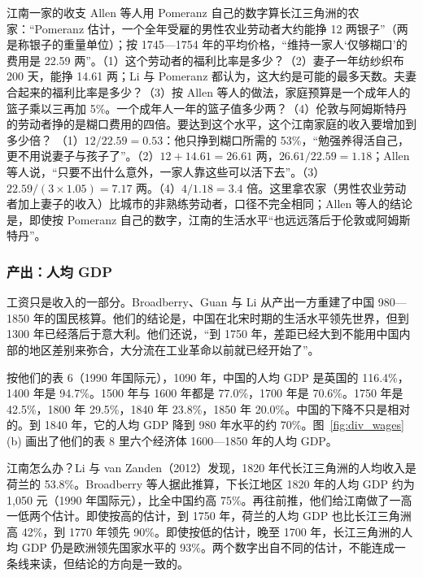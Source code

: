 \begin{example}{江南一家的收支}\label{ex:divergence-welfare}
Allen 等人用 Pomeranz 自己的数字算长江三角洲的农家：“Pomeranz 估计，一个全年受雇的男性农业劳动者大约能挣 12 两银子”（两是称银子的重量单位）；按 1745—1754 年的平均价格，“维持一家人‘仅够糊口’的费用是 22.59 两”\cite{allen2009wp}。（1）这个劳动者的福利比率是多少？（2）妻子一年纺纱织布 200 天，能挣 14.61 两；Li 与 Pomeranz 都认为，这大约是可能的最多天数。夫妻合起来的福利比率是多少？（3）按 Allen 等人的做法，家庭预算是一个成年人的篮子乘以三再加 5\%。一个成年人一年的篮子值多少两？（4）伦敦与阿姆斯特丹的劳动者挣的是糊口费用的四倍。要达到这个水平，这个江南家庭的收入要增加到多少倍？
\solution （1）$12/22.59=0.53$：他只挣到糊口所需的 53\%，“勉强养得活自己，更不用说妻子与孩子了”\cite{allen2009wp}。（2）$12+14.61=26.61$ 两，$26.61/22.59=1.18$；Allen 等人说，“只要不出什么意外，一家人靠这些可以活下去”\cite{allen2009wp}。（3）$22.59/(3\times1.05)=7.17$ 两。（4）$4/1.18=3.4$ 倍。这里拿农家（男性农业劳动者加上妻子的收入）比城市的非熟练劳动者，口径不完全相同；Allen 等人的结论是，即使按 Pomeranz 自己的数字，江南的生活水平“也远远落后于伦敦或阿姆斯特丹”\cite{allen2009wp}。
\end{example}

\subsubsection{产出：人均 GDP}
工资只是收入的一部分。Broadberry、Guan 与 Li 从产出一方重建了中国 980—1850 年的国民核算\cite{bgl2017,bgl2018}。他们的结论是，中国在北宋时期的生活水平领先世界，但到 1300 年已经落后于意大利。他们还说，“到 1750 年，差距已经大到不能用中国内部的地区差别来弥合，大分流在工业革命以前就已经开始了”\cite{bgl2017}。

按他们的表 6（1990 年国际元），1090 年，中国的人均 GDP 是英国的 116.4\%，1400 年是 94.7\%。1500 年与 1600 年都是 77.0\%，1700 年是 70.6\%。1750 年是 42.5\%，1800 年 29.5\%，1840 年 23.8\%，1850 年 20.0\%\cite{bgl2017}。中国的下降不只是相对的。到 1840 年，它的人均 GDP 降到 980 年水平的约 70\%\cite{bgl2017}。图~\ref{fig:div_wages}(b) 画出了他们的表 8 里六个经济体 1600—1850 年的人均 GDP。

江南怎么办？Li 与 van Zanden（2012）发现，1820 年代长江三角洲的人均收入是荷兰的 53.8\%。Broadberry 等人据此推算，下长江地区 1820 年的人均 GDP 约为 1,050 元（1990 年国际元），比全中国约高 75\%\cite{bgl2017}。再往前推，他们给江南做了一高一低两个估计。即使按高的估计，到 1750 年，荷兰的人均 GDP 也比长江三角洲高 42\%，到 1770 年领先 90\%。即使按低的估计，晚至 1700 年，长江三角洲的人均 GDP 仍是欧洲领先国家水平的 93\%\cite{bgl2017}。两个数字出自不同的估计，不能连成一条线来读，但结论的方向是一致的。

